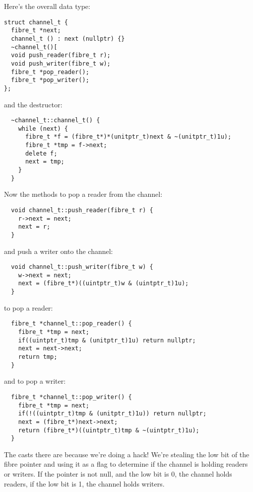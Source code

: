 \documentclass[oneside]{book}
\begin{document}
Here's the overall data type:

\begin{verbatim}
struct channel_t {
  fibre_t *next;
  channel_t () : next (nullptr) {}
  ~channel_t()[
  void push_reader(fibre_t r); 
  void push_writer(fibre_t w); 
  fibre_t *pop_reader(); 
  fibre_t *pop_writer();
};
\end{verbatim}

and the destructor:

\begin{verbatim}
  ~channel_t::channel_t() {
    while (next) {
      fibre_t *f = (fibre_t*)*(unitptr_t)next & ~(unitptr_t)1u);
      fibre_t *tmp = f->next;
      delete f;
      next = tmp;
    }
  }
\end{verbatim}
 
Now the methods to pop a reader from the channel:

\begin{verbatim}
  void channel_t::push_reader(fibre_t r) { 
    r->next = next; 
    next = r; 
  }
\end{verbatim}

and push a writer onto the channel:

\begin{verbatim}
  void channel_t::push_writer(fibre_t w) { 
    w->next = next; 
    next = (fibre_t*)((uintptr_t)w & (uintptr_t)1u); 
  }
\end{verbatim}

to pop a reader:

\begin{verbatim}
  fibre_t *channel_t::pop_reader() { 
    fibre_t *tmp = next; 
    if((uintptr_t)tmp & (unitptr_t)1u) return nullptr;
    next = next->next; 
    return tmp; 
  }
\end{verbatim}

and to pop a writer:

\begin{verbatim}
  fibre_t *channel_t::pop_writer() { 
    fibre_t *tmp = next; 
    if(!((uintptr_t)tmp & (unitptr_t)1u)) return nullptr;
    next = (fibre_t*)next->next; 
    return (fibre_t*)((uintptr_t)tmp & ~(uintptr_t)1u); 
  }
\end{verbatim}

The casts there are because we're doing a hack!
We're stealing the low bit of the fibre pointer and using
it as a flag to determine if the channel is holding readers
or writers. If the pointer is not null, and the low bit is
0, the channel holds readers, if the low bit is 1, the channel
holds writers.
\end{document}
